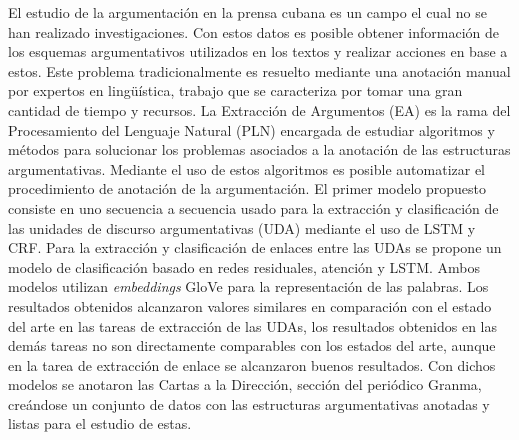 \begin{resumen}



El estudio de la argumentación en la prensa cubana es un campo el cual no se 
han realizado investigaciones. Con estos datos es posible obtener 
información de los esquemas argumentativos utilizados en los textos y
realizar acciones en base a estos.
Este problema tradicionalmente es resuelto mediante 
una anotación manual por expertos en lingüística, trabajo que se 
caracteriza por tomar una gran cantidad de tiempo y recursos. La Extracción
de Argumentos (EA) es la rama del Procesamiento del Lenguaje Natural (PLN) 
encargada de estudiar algoritmos y métodos para solucionar los problemas
asociados a la anotación de las estructuras argumentativas. Mediante el uso 
de estos algoritmos es posible automatizar el procedimiento de anotación
de la argumentación. El primer modelo propuesto 
consiste en uno secuencia a secuencia usado para la extracción y clasificación
de las unidades de discurso argumentativas (UDA) mediante el uso de LSTM y 
CRF. Para la extracción y clasificación de 
enlaces entre las UDAs se propone un modelo de clasificación basado en redes residuales,
atención y LSTM. Ambos modelos utilizan \emph{embeddings} GloVe para la representación 
de las palabras. Los resultados obtenidos alcanzaron valores similares en comparación
con el estado del arte en las tareas de extracción de las UDAs, los resultados obtenidos 
en las demás tareas no son directamente comparables con los estados del arte, aunque en 
la tarea de extracción de enlace se alcanzaron buenos resultados.
Con dichos modelos se anotaron las Cartas a la Dirección, sección del 
periódico Granma, creándose un conjunto de datos con las estructuras argumentativas anotadas
y listas para el estudio de estas.




\end{resumen}
